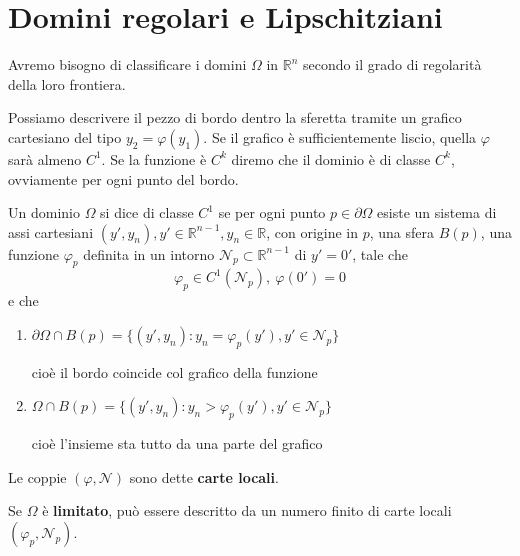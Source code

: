 \section{Domini regolari e Lipschitziani}

Avremo bisogno di classificare i domini $\Omega $ in $\mathbb{R}^{n}$ secondo il grado di regolarità della loro frontiera.

Possiamo descrivere il pezzo di bordo dentro la sferetta tramite un grafico cartesiano del tipo $y_{2} =\varphi (y_{1})$. Se il grafico è sufficientemente liscio, quella $\varphi $ sarà almeno $C^{1}$. Se la funzione è $C^{k}$ diremo che il dominio è di classe $C^{k}$, ovviamente per ogni punto del bordo.


\begin{definition}
    Un dominio $\Omega $ si dice di classe $C^{1}$ se per ogni punto $p\in \partial \Omega $ esiste un sistema di assi cartesiani $(y',y_{n}),y'\in \mathbb{R}^{n-1},y_{n} \in \mathbb{R}$, con origine in $p$, una sfera $B(p)$, una funzione $\varphi _{p}$ definita in un intorno $\mathcal{N}_{p} \subset \mathbb{R}^{n-1}$ di $y'=0'$, tale che
    \begin{equation*}
        \varphi _{p} \in C^{1}(\mathcal{N}_{p}),\ \varphi (0') =0
    \end{equation*}
    e che
    \begin{enumerate}
        \item $\partial \Omega \cap B(p) =\{(y',y_{n}) :y_{n} =\varphi _{p}(y'),y'\in \mathcal{N}_{p}\}$

              cioè il bordo coincide col grafico della funzione
        \item $\Omega \cap B(p) =\{(y',y_{n}) :y_{n}  >\varphi _{p}(y'),y'\in \mathcal{N}_{p}\}$

              cioè l'insieme sta tutto da una parte del grafico
    \end{enumerate}
\end{definition}

Le coppie $(\varphi,\mathcal{N})$ sono dette \textbf{carte locali}.

Se $\Omega $ è \textbf{limitato}, può essere descritto da un numero finito di carte locali $(\varphi _{p},\mathcal{N}_{p})$.

